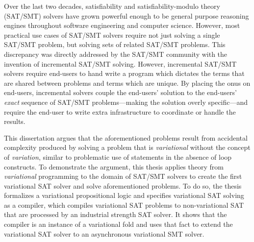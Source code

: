 Over the last two decades, satisfiability and satisfiability-modulo theory
(SAT/SMT) solvers have grown powerful enough to be general purpose reasoning
engines throughout software engineering and computer science. However, most
practical use cases of SAT/SMT solvers require not just solving a single SAT/SMT
problem, but solving sets of related SAT/SMT problems. This discrepancy was
directly addressed by the SAT/SMT community with the invention of incremental
SAT/SMT solving. However, incremental SAT/SMT solvers require end-users to hand
write a program which dictates the terms that are shared between problems and
terms which are unique. By placing the onus on end-users, incremental solvers
couple the end-users' solution to the end-users' \emph{exact} sequence of
SAT/SMT problems---making the solution overly specific---and require the
end-user to write extra infrastructure to coordinate or handle the results.

This dissertation argues that the aforementioned problems result from accidental
complexity produced by solving a problem that is \emph{variational} without the
concept of \emph{variation}, similar to problematic use of  statements
in the absence of  loop constructs. To demonstrate the argument, this
thesis applies theory from \emph{variational} programming to the domain of
SAT/SMT solvers to create the first variational SAT solver and solve
aforementioned problems.
%
To do so, the thesis formalizes a variational propositional logic and specifies
variational SAT solving as a compiler, which compiles variational SAT problems
to non-variational SAT that are processed by an industrial strength SAT solver.
It shows that the compiler is an instance of a variational fold and uses that
fact to extend the variational SAT solver to an asynchronous variational SMT
solver.

